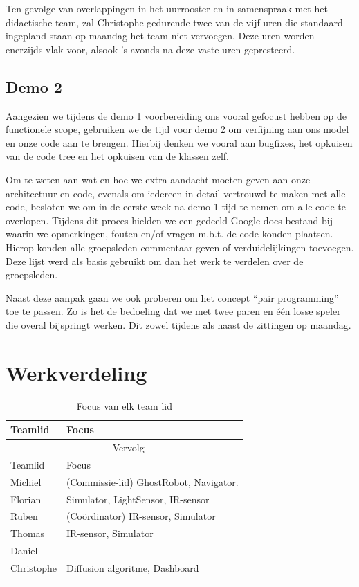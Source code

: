 \documentclass[12pt,a4paper]{report}
\begin{document}
Ten gevolge van overlappingen in het uurrooster en in samenspraak met het didactische team, zal Christophe gedurende twee van de vijf uren die standaard ingepland staan op maandag het team niet vervoegen. Deze uren worden enerzijds vlak voor, alsook 's avonds na deze vaste uren gepresteerd.

\section{Demo 2}

Aangezien we tijdens de demo 1 voorbereiding ons vooral gefocust hebben op de functionele scope, gebruiken we de tijd voor demo 2 om verfijning aan ons model en onze code aan te brengen. Hierbij denken we vooral aan bugfixes, het opkuisen van de code tree en het opkuisen van de klassen zelf.

Om te weten aan wat en hoe we extra aandacht moeten geven aan onze architectuur en code, evenals om iedereen in detail vertrouwd te maken met alle code, besloten we om in de eerste week na demo 1 tijd te nemen om alle code te overlopen. Tijdens dit proces hielden we een gedeeld Google docs bestand bij waarin we opmerkingen, fouten en/of vragen m.b.t. de code konden plaatsen. Hierop konden alle groepsleden commentaar geven of verduidelijkingen toevoegen. Deze lijst werd als basis gebruikt om dan het werk te verdelen over de groepsleden.

Naast deze aanpak gaan we ook proberen om het concept ``pair programming'' toe te passen. Zo is het de bedoeling dat we met twee paren en \'e\'en losse speler die overal bijspringt werken. Dit zowel tijdens als naast de zittingen op maandag.

\chapter{Werkverdeling}

\begin{longtable}{l l}
\caption{Focus van elk team lid} \\ [0.5ex]
\hline\hline
Teamlid & Focus \\ [0.5ex]
\hline 
\endfirsthead
\multicolumn{2}{c}{{\tablename} \thetable{} -- Vervolg} \\[0.5ex]
\hline \hline
Teamlid & Focus \\ [0.5ex]
\hline 
\endhead
Michiel 		& 	(Commissie-lid) GhostRobot, Navigator. \\
Florian 		&	Simulator, LightSensor, IR-sensor\\
Ruben 		&	(Co\"ordinator) IR-sensor, Simulator\\
Thomas 		&	IR-sensor, Simulator\\
Daniel 		&	\\
Christophe 	&	Diffusion algoritme, Dashboard \\
\hline
\label{tab:focus}
\end{longtable}
\end{document}
